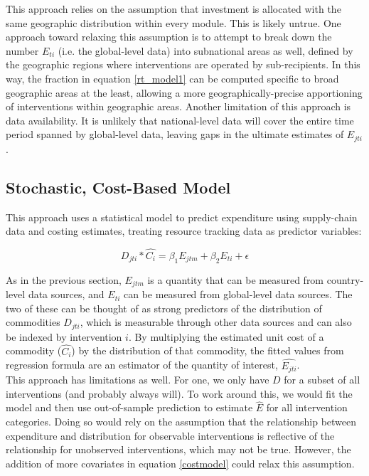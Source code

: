 \documentclass[twocolumn]{bmcart}%
\begin{document}
This approach relies on the assumption that investment is allocated with the same geographic distribution  within every module. This is likely untrue. One approach toward relaxing this assumption is to attempt to break down the number $E_{ti}$ (i.e. the global-level data) into subnational areas as well, defined by the geographic regions where interventions are operated by sub-recipients. In this way, the fraction in equation \ref{rt_model1} can be computed specific to broad geographic areas at the least, allowing a more geographically-precise apportioning of interventions within geographic areas. Another limitation of this approach is data availability. It is unlikely that national-level data will cover the entire time period spanned by global-level data, leaving gaps in the ultimate estimates of $E_{jti}$.

\subsection{Stochastic, Cost-Based Model}

This approach uses a statistical model to predict expenditure using supply-chain data and costing estimates, treating resource tracking data as predictor variables:

\begin{equation}
  \label{costmodel}
  D_{jti} * \widehat{C_i} = \beta_1 E_{jtm} + \beta_2 E_{ti} + \epsilon
\end{equation}

As in the previous section, $E_{jtm}$ is a quantity that can be measured from country-level data sources, and $E_{ti}$ can be measured from global-level data sources. The two of these can be thought of as strong predictors of the distribution of commodities $D_{jti}$, which is measurable through other data sources and can also be indexed by intervention $i$. By multiplying the estimated unit cost of a commodity ($\widehat{C_i}$) by the distribution of that commodity, the fitted values from regression formula are an estimator of the quantity of interest, $\widehat{E_{jti}}$. \\

This approach has limitations as well. For one, we only have $D$ for a subset of all interventions (and probably always will). To work around this, we would fit the model and then use out-of-sample prediction to estimate $\hat{E}$ for all intervention categories. Doing so would rely on the assumption that the relationship between expenditure and distribution for observable interventions is reflective of the relationship for unobserved interventions, which may not be true. However, the addition of more covariates in equation \ref{costmodel} could relax this assumption.
\end{document}
